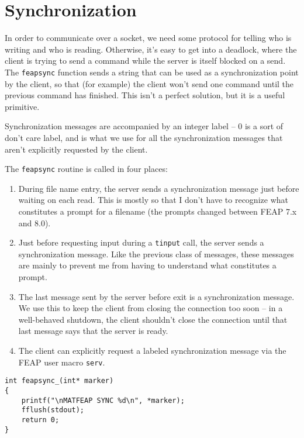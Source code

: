 \section{Synchronization}

In order to communicate over a socket, we need some protocol for telling
who is writing and who is reading.  Otherwise, it's easy to get into a
deadlock, where the client is trying to send a command while the server
is itself blocked on a send.  The {\tt feapsync} function sends a string
that can be used as a synchronization point by the client, so that (for
example) the client won't send one command until the previous command has
finished.  This isn't a perfect solution, but it is a useful primitive.

Synchronization messages are accompanied by an integer label -- 0 is
a sort of don't care label, and is what we use for all the synchronization
messages that aren't explicitly requested by the client.

The {\tt feapsync} routine is called in four places:
\begin{enumerate}
\item
During file name entry, the server sends a synchronization message
just before waiting on each read.  This is mostly so that I don't
have to recognize what constitutes a prompt for a filename
(the prompts changed between FEAP 7.x and 8.0).

\item
Just before requesting input during a {\tt tinput} call, the server
sends a synchronization message.  Like the previous class of messages,
these messages are mainly to prevent me from having to understand
what constitutes a prompt.

\item
The last message sent by the server before exit is a synchronization
message.  We use this to keep the client from closing the connection
too soon -- in a well-behaved shutdown, the client shouldn't close the
connection until that last message says that the server is ready.

\item
The client can explicitly request a labeled synchronization message
via the FEAP user macro {\tt serv}.
\end{enumerate}

\begin{verbatim}
int feapsync_(int* marker)
{
    printf("\nMATFEAP SYNC %d\n", *marker);
    fflush(stdout);
    return 0;
}

\end{verbatim}
